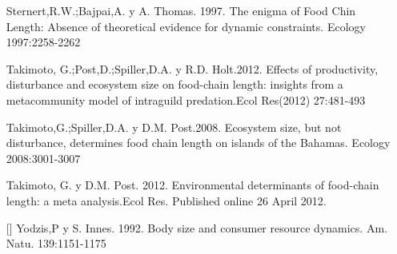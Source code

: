\documentclass[a4paper,12pt]{article}
\begin{document}
\begin{itemize}
\item[] Sternert,R.W.;Bajpai,A. y A. Thomas. 1997. The enigma of Food Chin Length: Absence of theoretical evidence for dynamic constraints. Ecology 1997:2258-2262\\
\item[] Takimoto, G.;Post,D.;Spiller,D.A. y R.D. Holt.2012. Effects of productivity, disturbance and ecosystem size on food-chain length: insights from a metacommunity model of intraguild predation.Ecol Res(2012) 27:481-493\\
\item[] Takimoto,G.;Spiller,D.A. y D.M. Post.2008. Ecosystem size, but not disturbance, determines food chain length on islands of the Bahamas. Ecology 2008:3001-3007\\
\item[] Takimoto, G. y D.M. Post. 2012. Environmental determinants of food-chain length: a meta analysis.Ecol Res. Published online 26 April 2012.\\
\item[][] Yodzis,P y S. Innes. 1992. Body size and consumer resource dynamics. Am. Natu. 139:1151-1175\\
\end{itemize}
\end{document}
